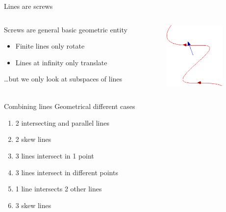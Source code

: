 \documentclass{beamer}
\begin{document}
\begin{frame}{Lines are screws}
  \begin{columns}
    \begin{column}{7cm}
      Screws are general basic geometric entity
      \begin{itemize}
        \item Finite lines only rotate
        \item Lines at infinity only translate
      \end{itemize}
      \ldots but we only look at subspaces of lines
    \end{column}
    \begin{column}{3cm}
      \begin{center}
        \includegraphics[width=3cm]{screw}
      \end{center}
    \end{column}
  \end{columns}
\end{frame}

\begin{frame}{Combining lines}
  Geometrical different cases
  \begin{enumerate}
    \item 2 intersecting and parallel lines
    \item 2 skew lines
    \item 3 lines intersect in 1 point
    \item 3 lines intersect in different points
    \item 1 line intersects 2 other lines
    \item 3 skew lines
  \end{enumerate}
\end{frame}
\end{document}
